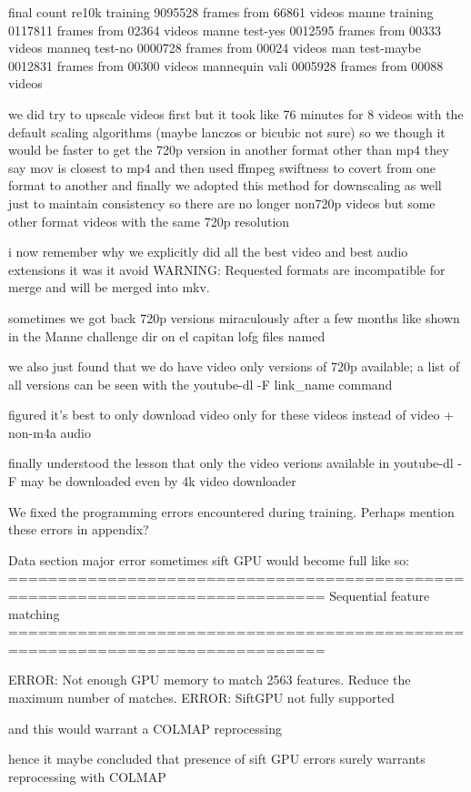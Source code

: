 final count 
re10k training 9095528 frames from 66861 videos 
manne training 0117811 frames from 02364 videos
manne test-yes 0012595 frames from 00333 videos
manneq test-no 0000728 frames from 00024 videos
man test-maybe 0012831 frames from 00300 videos
mannequin vali 0005928 frames from 00088 videos

we did try to upscale videos first but it took like 76 minutes for 8 videos with the default scaling algorithms (maybe lanczos or bicubic not sure) 
so we though it would be faster to get the 720p version in another format other than mp4 they say mov is closest to mp4 and then used ffmpeg swiftness to covert from one format to another
and finally we adopted this method for downscaling as well
just to maintain consistency 
so there are no longer non720p videos but some other format videos with the same 720p resolution

i now remember why we explicitly did all the best video and best audio extensions it was it avoid 
WARNING: Requested formats are incompatible for merge and will be merged into mkv.

sometimes we got back 720p versions miraculously after a few months like shown in the Manne challenge dir on el capitan lofg files named


we also just found that we do have video only versions of 720p available; a list of all versions can be seen with the youtube-dl -F link\_name command

figured it's best to only download video only for these videos instead of video + non-m4a audio

finally understood the lesson that only the video verions available in youtube-dl -F may be downloaded even by 4k video downloader

We fixed the programming errors encountered during training. Perhaps mention these errors in appendix?

Data section major error sometimes sift GPU would become full like so:
==============================================================================
Sequential feature matching
==============================================================================

ERROR: Not enough GPU memory to match 2563 features. Reduce the maximum number of matches.
ERROR: SiftGPU not fully supported

and this would warrant a COLMAP reprocessing

hence it maybe concluded that presence of sift GPU errors surely warrants reprocessing with COLMAP

